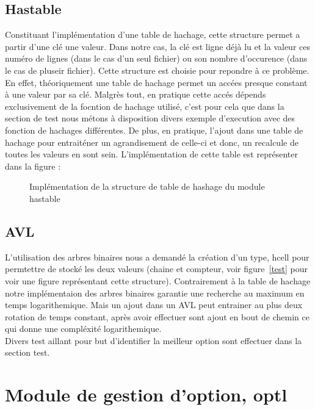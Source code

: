 \documentclass[12pt]{article}
\begin{document}
    \subsection{Hastable}

    Constituant l'implémentation d'une table de hachage, cette structure permet 
    a partir d'une clé une valeur. Dans notre cas, la clé est ligne déjà lu et 
    la valeur ces numéro de lignes (dans le cas d'un seul fichier) ou son 
    nombre d'occurence (dans le cas de pluseir fichier). Cette structure est 
    choisie pour repondre à ce problème. En effet, théoriquement une 
    table de hachage permet un accées presque constant à une valeur par sa clé. 
    Malgrès tout, en pratique cette accés dépends exclusivement de la focntion 
    de hachage utilisé, c'est pour cela que dans la section de test nous métons 
    à disposition divers exemple d'execution avec des fonction de hachages 
    différentes. De plus, en pratique, l'ajout dans une table de hachage pour 
    entraiténer un agrandisement de celle-ci et donc, un recalcule de toutes les 
    valeurs en sont sein. L'implémentation de cette table est représenter dans 
    la figure : 
    
    \begin{figure}[ht]
        \caption{Implémentation de la structure de table de hashage du module 
        hastable}\label{hastable-fig}
    \end{figure}

    \subsection{AVL}

    L'utilisation des arbres binaires nous a demandé la création d'un type, 
    hcell pour permtettre de stocké les deux valeurs (chaine et compteur, voir 
    figure~\ref{test} pour voir une figure représentant cette structure). 
    Contrairement à la table de hachage notre implémentaion des arbres binaires 
    garantie une recherche au maximum en temps logarithemique. Mais un ajout 
    dans un AVL peut entrainer au plus deux rotation de temps constant, après 
    avoir effectuer sont ajout en bout de chemin ce qui donne une compléxité 
    logarithemique.\\
    
    Divers test aillant pour but d'identifier la meilleur option sont effectuer 
    dans la section test.

    \section{Module de gestion d'option, optl}\label{opt}
\end{document}
